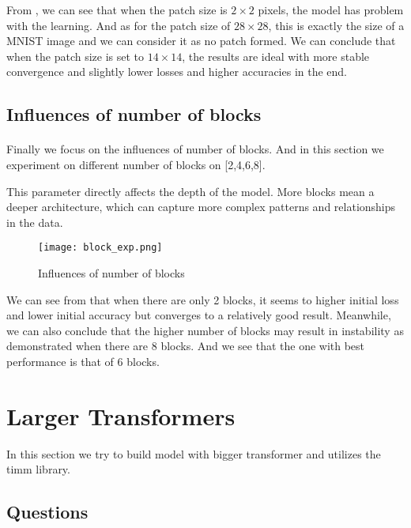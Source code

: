 \documentclass{article}
\begin{document}
From , we can see that when the patch size is  \(2 \times 2\) pixels, the model has problem with the learning. And as for the patch size of  \(28 \times 28\), this is exactly the size of a MNIST image and we can consider it as no patch formed. We can conclude that when the patch size is set to  \(14 \times 14\), the results are ideal with more stable convergence and slightly lower losses and higher accuracies in the end.

\subsection{Influences of number of blocks}
\paragraph{}
        Finally  we focus on the influences of number of blocks. And in this section we experiment on different number of blocks on [2,4,6,8].

This parameter directly affects the depth of the model. More blocks mean a deeper architecture, which can capture more complex patterns and relationships in the data. 
\begin{figure}[H]
    \centering
    \texttt{[image: block\_exp.png]}
    \caption{Influences of number of blocks}
    \label{fig:nb-blocks}
\end{figure}
We can see from  that when there are only 2 blocks, it seems to higher initial loss and lower initial accuracy but converges to a relatively good result. Meanwhile, we can also conclude that the higher number of blocks may result in instability as demonstrated when there are 8 blocks. And we see that the one with best performance is that of 6 blocks.

\section{Larger Transformers}
In this section we try to build model with bigger transformer and utilizes the timm library.

\subsection{Questions}
\end{document}
